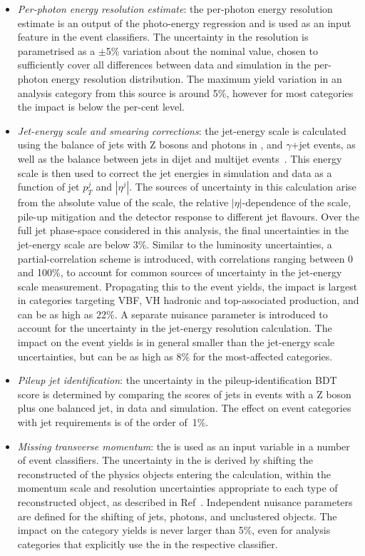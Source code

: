 \begin{itemize}
    \item \textit{Per-photon energy resolution estimate}: the per-photon energy resolution estimate is an output of the photo-energy regression and is used as an input feature in the event classifiers. The uncertainty in the resolution is parametrised as a $\pm$5\% variation about the nominal value, chosen to sufficiently cover all differences between data and simulation in the per-photon energy resolution distribution. The maximum yield variation in an analysis category from this source is around 5\%, however for most categories the impact is below the per-cent level. 
    
    \item \textit{Jet-energy scale and smearing corrections}: the jet-energy scale is calculated using the \pt balance of jets with Z bosons and photons in \Zee, \Zmumu and $\gamma$+jet events, as well as the \pt balance between jets in dijet and multijet events~\cite{Khachatryan:2016kdb}. This energy scale is then used to correct the jet energies in simulation and data as a function of jet $p^j_T$ and $|\eta^j|$. The sources of uncertainty in this calculation arise from the absolute value of the scale, the relative $|\eta|$-dependence of the scale, pile-up mitigation and the detector response to different jet flavours. Over the full jet phase-space considered in this analysis, the final uncertainties in the jet-energy scale are below 3\%. Similar to the luminosity uncertainties, a partial-correlation scheme is introduced, with correlations ranging between 0 and 100\%, to account for common sources of uncertainty in the jet-energy scale measurement. Propagating this to the event yields, the impact is largest in categories targeting VBF, VH hadronic and top-associated production, and can be as high as 22\%. A separate nuisance parameter is introduced to account for the uncertainty in the jet-energy resolution calculation. The impact on the event yields is in general smaller than the jet-energy scale uncertainties, but can be as high as 8\% for the most-affected categories.

    \item \textit{Pileup jet identification}: the uncertainty in the pileup-identification BDT score is determined by comparing the scores of jets in events with a Z boson plus one balanced jet, in data and simulation. The effect on event categories with jet requirements is of the order of~1\%.
    
    \item \textit{Missing transverse momentum}: the \met is used as an input variable in a number of event classifiers. The uncertainty in the \met is derived by shifting the reconstructed \pt of the physics objects entering the \met calculation, within the momentum scale and resolution uncertainties appropriate to each type of reconstructed object, as described in Ref~\cite{CMS-PAS-JME-16-003}. Independent nuisance parameters are defined for the \pt shifting of jets, photons, and unclustered objects. The impact on the category yields is never larger than 5\%, even for analysis categories that explicitly use the \met in the respective classifier.
    

\end{itemize}
